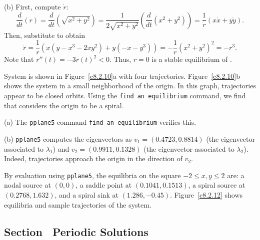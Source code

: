 \documentclass{ximera}
\begin{document}
(b) First, compute $\dot{r}$:
\[
\frac{d}{dt}(r) = \frac{d}{dt}(\sqrt{x^2 + y^2}) =
\frac{1}{2\sqrt{x^2 + y^2}}\left(\frac{d}{dt}(x^2 + y^2)\right)
= \frac{1}{r}(x\dot{x} + y\dot{y}).
\]
Then, substitute  to obtain
\[
\dot{r} = \frac{1}{r}(x(y - x^3 - 2xy^2) + y(-x - y^3))
= -\frac{1}{r}(x^2 + y^2)^2 = -r^3.
\]
Note that $r''(t) = -3r(t)^2 < 0$.  Thus, $r = 0$ is a stable equilibrium
of .

System  is shown in Figure~\ref{c8.2.10}a with four
trajectories.  Figure~\ref{c8.2.10}b shows the system in a small
neighborhood of the origin.  In this graph, trajectories appear to be
closed orbits.  Using the {\tt find an equilibrium} command, we find
that \Matlab considers the origin to be a spiral.

\begin{figure}[htb]
                       \centerline{%
                       }
\end{figure}

(a) The {\tt pplane5} command {\tt find an equilibrium} verifies this.

(b) {\tt pplane5} computes the eigenvectors as $v_1 = (0.4723,0.8814)$
(the eigenvector associated to $\lambda_1$) and $v_2 =
(0.9911,0.1328)$ (the eigenvector associated to $\lambda_2$).
Indeed, trajectories approach the origin in the direction of $v_2$.

By evaluation using {\tt pplane5}, the equilibria on the square
$-2 \leq x,y \leq 2$ are: a nodal source at $(0,0)$, a saddle point
at $(0.1041, 0.1513)$, a spiral source at $(0.2768,1.632)$, and a
spiral sink at $(1.286,-0.45)$.  Figure~\ref{c8.2.12} shows
equilibria and sample trajectories of the system.

\begin{figure}[htb]
                       \centerline{%
                       }
\end{figure}

\subsection*{Section~\protect{\ref{S:periodic}} Periodic Solutions}
\end{document}
